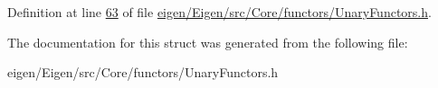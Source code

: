 Definition at line \hyperlink{eigen_2_eigen_2src_2_core_2functors_2_unary_functors_8h_source_l00063}{63} of file \hyperlink{eigen_2_eigen_2src_2_core_2functors_2_unary_functors_8h_source}{eigen/\+Eigen/src/\+Core/functors/\+Unary\+Functors.\+h}.



The documentation for this struct was generated from the following file\+:\begin{DoxyCompactItemize}
\item 
eigen/\+Eigen/src/\+Core/functors/\+Unary\+Functors.\+h\end{DoxyCompactItemize}
